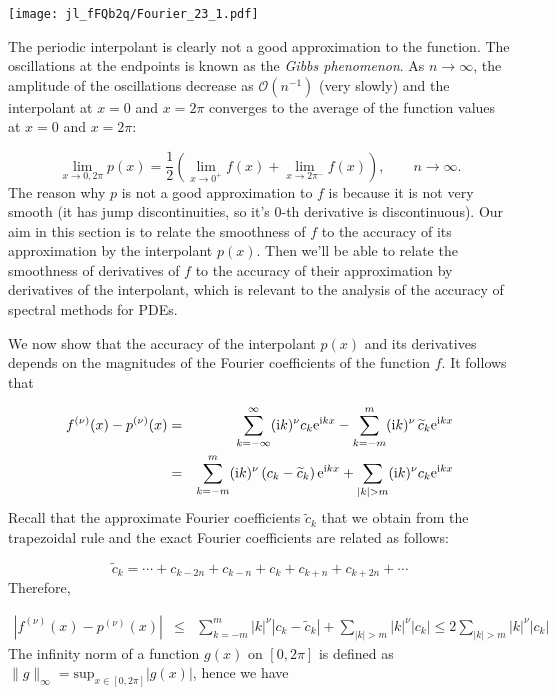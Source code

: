 \documentclass[12pt,a4paper]{article}
\begin{document}
\texttt{[image: jl\_fFQb2q/Fourier\_23\_1.pdf]}

The periodic interpolant is clearly not a good approximation to the function.  The oscillations at the endpoints is known as the \emph{Gibbs phenomenon}.  As $n \to \infty$, the amplitude of the oscillations decrease as $\mathcal{O}(n^{-1})$ (very slowly) and the interpolant at $x=0$ and $x =2\pi$ converges to the average of the function values at  $x=0$ and $x =2\pi$:

\[
\lim_{x\to 0, 2\pi}p(x) = \frac{1}{2}\left(\lim_{x \to 0^{+}}f(x) + \lim_{x \to 2\pi^{-}}f(x)\right), \qquad n \to \infty.
\]
The reason why $p$ is not a good approximation to $f$ is because it is not very smooth (it has jump discontinuities, so it's $0$-th derivative is discontinuous). Our aim in this section is to relate the smoothness of $f$ to the accuracy of its approximation by the interpolant $p(x)$.  Then we'll be able to relate the smoothness of derivatives of $f$ to the accuracy of their approximation by derivatives of the interpolant, which is relevant to the analysis of the accuracy of spectral methods for PDEs.

We now show that the accuracy of the interpolant $p(x)$ and its derivatives depends on the magnitudes of the Fourier coefficients of the function $f$. It follows that


\begin{eqnarray*}
f^{(\nu)}(x) - p^{(\nu)}(x) & = & \sum_{k=-\infty}^{\infty}({\rm i}k)^{\nu}c_k{\rm e}^{{\rm i}kx} - \sum_{k=-m}^{m}({\rm i}k)^{\nu}\,\widetilde{c}_k{\rm e}^{{\rm i}kx} \\
 &=& \sum_{k=-m}^{m}({\rm i}k)^{\nu}\left(c_k - \widetilde{c}_k\right){\rm e}^{{\rm i}kx} + \sum_{\vert k \vert > m} ({\rm i}k)^{\nu}c_k{\rm e}^{{\rm i}kx}
\end{eqnarray*}
Recall that the approximate Fourier coefficients $\widetilde{c}_k$ that we obtain from the trapezoidal rule and the exact Fourier coefficients are related as follows:

\[
\widetilde{c}_k = \cdots + c_{k-2n} + c_{k-n} +  c_k +  c_{k+n} + c_{k+2n} + \cdots
\]
Therefore,


\begin{eqnarray}
\left\vert f^{(\nu)}(x) - p^{(\nu)}(x) \right\vert & \leq &  \sum_{k=-m}^{m} \vert k\vert^{\nu}\left\vert c_k - \widetilde{c}_k\right\vert + \sum_{\vert k \vert > m} \vert k \vert^{\nu} \vert c_k \vert \leq  2\sum_{\vert k \vert > m} \vert k \vert^{\nu} \vert c_k \vert 
\end{eqnarray}
The infinity norm of a function $g(x)$ on $[0, 2\pi]$ is defined as $\| g \|_{\infty} = \mathrm{sup}_{x\in[0,2\pi]} \vert g(x) \vert$, hence we have
\end{document}
